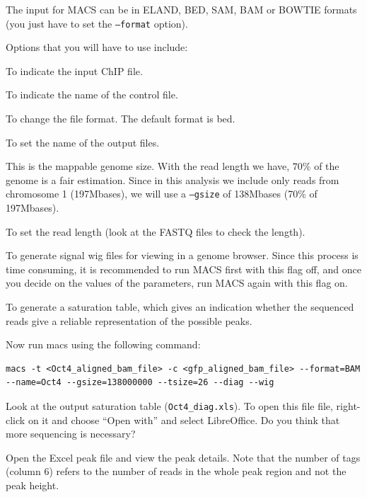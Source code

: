 \begin{information}
The input for MACS can be in ELAND, BED, SAM, BAM or BOWTIE formats (you just
have to set the \texttt{--format} option).

Options that you will have to use include: 

\begin{description}[style=multiline,labelindent=0cm,align=right,leftmargin=\descriptionlabelspace,rightmargin=1.5cm,font=\ttfamily]
 \item[-t] To indicate the input ChIP file.
 \item[-c] To indicate the name of the control file.
 \item[--format] To change the file format. The default format is bed.
 \item[--name] To set the name of the output files.
 \item[--gsize] This is the mappable genome size. With the read length we have,
 $70\%$ of the genome is a fair estimation. Since in this analysis we include
 only reads from chromosome 1 (197Mbases), we will use a \texttt{--gsize} of 138Mbases (70\% of 197Mbases).
 \item[--tsize] To set the read length (look at the FASTQ files to check the
 length).
 \item[--wig] To generate signal wig files for viewing in a genome browser.
 Since this process is time consuming, it is recommended to run MACS first with
 this flag off, and once you decide on the values of the parameters, run MACS
 again with this flag on.
 \item[--diag] To generate a saturation table, which gives an indication whether
 the sequenced reads give a reliable representation of the possible peaks.
\end{description}
\end{information}

\begin{steps}
Now run macs using the following command:

\begin{lstlisting}[style=command_syntax]
macs -t <Oct4_aligned_bam_file> -c <gfp_aligned_bam_file> --format=BAM --name=Oct4 --gsize=138000000 --tsize=26 --diag --wig 
\end{lstlisting}

Look at the output saturation table (\texttt{Oct4\_diag.xls}). To open this file
file, right-click on it and choose ``Open with'' and select LibreOffice. Do you think
that more sequencing is necessary?

Open the Excel peak file and view the peak details. Note that the number of tags
(column 6) refers to the number of reads in the whole peak region and not the
peak height.

\end{steps}

